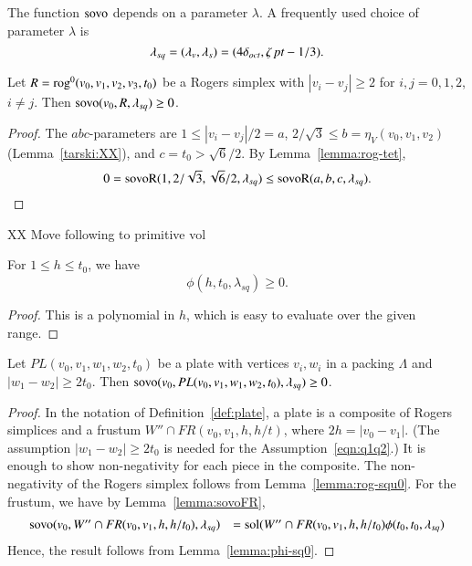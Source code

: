 The function ${\operatorname{sovo}}$ depends on a parameter $\lambda$.
A frequently used choice of parameter $\lambda$ is
$$
 \lambda_{sq} =(\lambda_v,\lambda_s)=(4\delta_{oct},\zeta\,\hbox{\it pt}-1/3).
$$


\begin{lemma}\label{lemma:rog-squ0}
Let $R={\operatorname{rog}}^0(v_0,v_1,v_2,v_3,t_0)$ be a Rogers simplex
with $|v_i-v_j|\ge 2$ for $i,j=0,1,2$, $i\ne j$.
Then ${\operatorname{sovo}}(v_0,R,\lambda_{sq})\ge 0$.
\end{lemma}

\begin{proof}
The $abc$-parameters are $1 \le |v_i-v_j|/2 = a$,
$2/\sqrt{3}\le b = \eta_V(v_0,v_1,v_2)$ (Lemma~\ref{tarski:XX}),
and $c = t_0 > \sqrt6/2$.  By Lemma~\ref{lemma:rog-tet},
$$
0 = {\operatorname{sovoR}}(1,2/\sqrt{3},\sqrt{6}/2,\lambda_{sq}) 
   \le {\operatorname{sovoR}}(a,b,c,\lambda_{sq}).
$$
\end{proof}

XX Move following to primitive vol

\begin{lemma}\label{lemma:phi-sq0}
For $1\le h\le t_0$, we have
$$
\phi(h,t_0,\lambda_{sq})\ge 0.
$$
\end{lemma}

\begin{proof}
This is a polynomial in $h$, which is easy to evaluate over the
given range.
\end{proof}


\begin{lemma}\label{lemma:pl-sq0}
Let $PL(v_0,v_1,w_1,w_2,t_0)$ be a plate with
vertices $v_i,w_i$ in a packing $\Lambda$ and $|w_1-w_2|\ge 2 t_0$.
Then
${\operatorname{sovo}}(v_0,PL(v_0,v_1,w_1,w_2,t_0),\lambda_{sq}) \ge 0$. 
\end{lemma}

\begin{proof} In the notation of Definition~\ref{def:plate},
a plate is a composite of Rogers simplices and
a frustum $W''\cap FR(v_0,v_1,h,h/t)$,
where $2h = |v_0-v_1|$.  (The assumption $|w_1-w_2|\ge 2 t_0$
is needed for the Assumption~\ref{eqn:q1q2}.)
It is enough to show non-negativity for each piece in the composite.
The non-negativity of the Rogers simplex follows from Lemma~\ref{lemma:rog-squ0}.
For the frustum, we have by Lemma~\ref{lemma:sovoFR},
$$
\begin{array}{lll}
{\operatorname{sovo}}(v_0,W''\cap FR(v_0,v_1,h,h/t_0),\lambda_{sq}) &=
  \operatorname{sol}(W''\cap FR(v_0,v_1,h,h/t_0) \phi(t_0,t_0,\lambda_{sq})\\
\end{array}
$$
Hence, the result follows from Lemma~\ref{lemma:phi-sq0}.
\end{proof}


